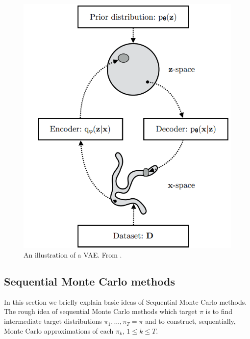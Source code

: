 \documentclass[english,graybox,envcountchap,envcountsame,sectrefs,shortlabels]{svmono}
\theoremstyle{style}
\begin{document}
\begin{figure}
\centering
\includegraphics[scale=0.8]{vae.png}
\caption{An illustration of a VAE. From \cite{kingma2019introduction}.}
\label{fig:vae}
\end{figure}


\subsection{Sequential Monte Carlo methods}
In this section we briefly explain basic ideas of Sequential Monte Carlo methods.
The rough idea of sequential Monte Carlo methods which target $\pi$ is to find intermediate target distributions $\pi_1, \ldots , \pi_T=\pi$ and to construct, sequentially, Monte Carlo approximations of each $\pi_k$, $1\leq k \leq T$.
\end{document}
